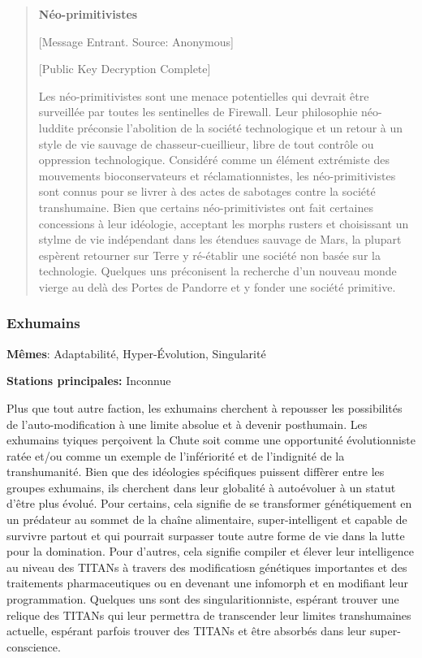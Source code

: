 \begin{quotation} \textbf{Néo-primitivistes} 

[Message Entrant. Source: Anonymous] 

[Public Key Decryption Complete] 

Les néo-primitivistes sont une menace potentielles qui devrait être surveillée par toutes les sentinelles de Firewall. Leur philosophie néo-luddite préconsie l'abolition de la société technologique et un retour à un style de vie sauvage de chasseur-cueillieur, libre de tout contrôle ou oppression technologique. Considéré comme un élément extrémiste des mouvements bioconservateurs et réclamationnistes, les néo-primitivistes sont connus pour se livrer à des actes de sabotages contre la société transhumaine. Bien que certains néo-primitivistes ont fait certaines concessions à leur idéologie, acceptant les morphs rusters et choisissant un stylme de vie indépendant dans les étendues sauvage de Mars, la plupart espèrent retourner sur Terre y ré-établir une société non basée sur la technologie. Quelques uns préconisent la recherche d'un nouveau monde vierge au delà des Portes de Pandorre et y fonder une société primitive. \end{quotation} 

\subsubsection{Exhumains} \label{sec:exhumans} 

\textbf{Mêmes}: Adaptabilité, Hyper-Évolution, Singularité 

\textbf{Stations principales:} Inconnue 

Plus que tout autre faction, les exhumains cherchent à repousser les possibilités de l'auto-modification à une limite absolue et à devenir posthumain. Les exhumains tyiques perçoivent la Chute soit comme une opportunité évolutionniste ratée et/ou comme un exemple de l'infériorité et de l'indignité de la transhumanité. Bien que des idéologies spécifiques puissent diffèrer entre les groupes exhumains, ils cherchent dans leur globalité à autoévoluer à un statut d'être plus évolué. Pour certains, cela signifie de se transformer génétiquement en un prédateur au sommet de la chaîne alimentaire, super-intelligent et capable de survivre partout et qui pourrait surpasser toute autre forme de vie dans la lutte pour la domination. Pour d'autres, cela signifie compiler et élever leur intelligence au niveau des TITANs à travers des modificatiosn génétiques importantes et des traitements pharmaceutiques ou en devenant une infomorph et en modifiant leur programmation. Quelques uns sont des singularitionniste, espérant trouver une relique des TITANs qui leur permettra de transcender leur limites transhumaines actuelle, espérant parfois trouver des TITANs et être absorbés dans leur super-conscience. 

